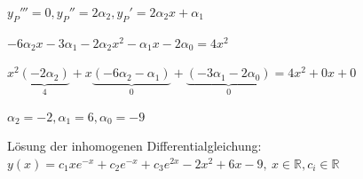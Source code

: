 \documentclass[fontset=ubuntu,12pt,a4paper,fleqn]{article}
\begin{document}
\({y_P}'''=0,{y_P}''=2\alpha_2,{y_P}'=2\alpha_2x+\alpha_1\)

\(-6\alpha_2x-3\alpha_1-2\alpha_2x^2-\alpha_1x-2\alpha_0=4x^2\)

\(x^2\underbrace{(-2\alpha_2)}_4+x\underbrace{(-6\alpha_2-\alpha_1)}_0+\underbrace{(-3\alpha_1-2\alpha_0)}_0=4x^2+0x+0\)

\(\alpha_2=-2,\alpha_1=6,\alpha_0=-9\)

Lösung der inhomogenen Differentialgleichung: \(y(x)=c_1xe^{-x}+c_2e^{-x}+c_3e^{2x}-2x^2+6x-9,\ x\in\mathbb{R},c_i\in\mathbb{R}\)

\newpage
\end{document}
